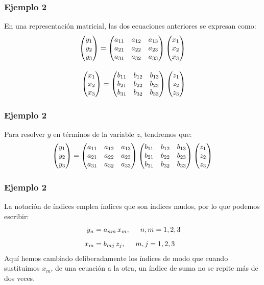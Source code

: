 \documentclass[12pt]{beamer}
\begin{document}
\begin{frame}
\frametitle{Ejemplo 2}
En una representación matricial, las dos ecuaciones anteriores se expresan como:
\fontsize{11}{11}\selectfont
\begin{align*}
\mqty(y_{1} \\ y_{2} \\ y_{3}) = \mqty(
a_{11} & a_{12} & a_{13} \\
a_{21} & a_{22} & a_{23} \\
a_{31} & a_{32} & a_{33}
) \, \mqty(
x_{1} \\ x_{2} \\ x_{3}
) \\[1em]
\mqty(x_{1} \\ x_{2} \\ x_{3}) = \mqty(
b_{11} & b_{12} & b_{13} \\
b_{21} & b_{22} & b_{23} \\
b_{31} & b_{32} & b_{33}
) \, \mqty(
z_{1} \\ z_{2} \\ z_{3}
)
\end{align*}
\end{frame}
\begin{frame}
\frametitle{Ejemplo 2}
Para resolver $y$ en términos de la variable $z$, tendremos que:
\begin{align*}
\mqty(y_{1} \\ y_{2} \\ y_{3}) = \mqty(
a_{11} & a_{12} & a_{13} \\
a_{21} & a_{22} & a_{23} \\
a_{31} & a_{32} & a_{33}
) \, \mqty(
b_{11} & b_{12} & b_{13} \\
b_{21} & b_{22} & b_{23} \\
b_{31} & b_{32} & b_{33}
) \, \mqty(
z_{1} \\ z_{2} \\ z_{3}
)        
\end{align*}
\end{frame}
\begin{frame}
\frametitle{Ejemplo 2}
La notación de índices emplea índices que son índices mudos, por lo que podemos escribir:
\begin{align*}
y_{n} &= a_{nm} \, x_{m}, \hspace{0.5cm} n, m = 1, 2, 3 \\[0.5em]
x_{m} &= b_{mj} \, z_{j}, \hspace{0.5cm} m, j = 1, 2, 3
\end{align*}
\pause
Aquí hemos cambiado deliberadamente los índices de modo que cuando sustituimos $x_{m}$, de una ecuación a la otra, un índice de suma no se repite más de dos veces.
\end{frame}
\end{document}
